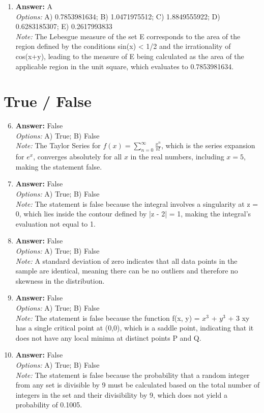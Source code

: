 \documentclass[12pt]{article}
\begin{document}
\begin{enumerate}[label=\arabic*.]
\item \textbf{Answer:} A
\\ \textit{Options:} A) 0.7853981634; B) 1.0471975512; C) 1.8849555922; D) 0.6283185307; E) 0.2617993833
\\ \textit{Note:} The Lebesgue measure of the set E corresponds to the area of the region defined by the conditions sin(x) \textless{} 1/2 and the irrationality of cos(x+y), leading to the measure of E being calculated as the area of the applicable region in the unit square, which evaluates to 0.7853981634.
\end{enumerate}

\section*{True / False}
\begin{enumerate}[label=\arabic*.]
\setcounter{enumi}{5}
\item \textbf{Answer:} False
\\ \textit{Options:} A) True; B) False
\\ \textit{Note:} The Taylor Series for \( f(x) = \sum_{n=0}^{\infty} \frac{x^n}{n!} \), which is the series expansion for \( e^x \), converges absolutely for all \( x \) in the real numbers, including \( x = 5 \), making the statement false.
\item \textbf{Answer:} False
\\ \textit{Options:} A) True; B) False
\\ \textit{Note:} The statement is false because the integral involves a singularity at z = 0, which lies inside the contour defined by |z - 2| = 1, making the integral's evaluation not equal to 1.
\item \textbf{Answer:} False
\\ \textit{Options:} A) True; B) False
\\ \textit{Note:} A standard deviation of zero indicates that all data points in the sample are identical, meaning there can be no outliers and therefore no skewness in the distribution.
\item \textbf{Answer:} False
\\ \textit{Options:} A) True; B) False
\\ \textit{Note:} The statement is false because the function f(x, y) = $x^3$ + $y^3$ + 3 xy has a single critical point at (0,0), which is a saddle point, indicating that it does not have any local minima at distinct points P and Q.
\item \textbf{Answer:} False
\\ \textit{Options:} A) True; B) False
\\ \textit{Note:} The statement is false because the probability that a random integer from any set is divisible by 9 must be calculated based on the total number of integers in the set and their divisibility by 9, which does not yield a probability of 0.1005.
\end{enumerate}
\end{document}
